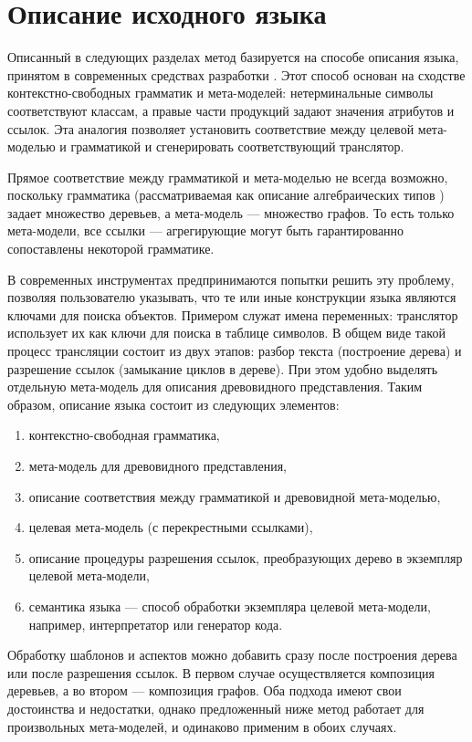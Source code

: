 \chapter{Описание исходного языка}

Описанный в следующих разделах метод базируется на способе описания языка, принятом в современных средствах разработки \cite{xText}. Этот способ основан на сходстве контекстно-свободных грамматик и мета-моделей: нетерминальные символы соответствуют классам, а правые части продукций задают значения атрибутов и ссылок. Эта аналогия позволяет установить соответствие между целевой мета-моделью и грамматикой и сгенерировать соответствующий транслятор.

Прямое соответствие между грамматикой и мета-моделью не всегда возможно, поскольку грамматика (рассматриваемая как описание алгебраических типов \cite{?}) задает множество деревьев, а мета-модель --- множество графов. То есть только мета-модели, все ссылки --- агрегирующие могут быть гарантированно сопоставлены некоторой грамматике.

В современных инструментах предпринимаются попытки решить эту проблему, позволяя пользователю указывать, что те или иные конструкции языка являются ключами для поиска объектов. Примером служат имена переменных: транслятор использует их как ключи для поиска в таблице символов. В общем виде такой процесс трансляции состоит из двух этапов: разбор текста (построение дерева) и разрешение ссылок (замыкание циклов в дереве).
При этом удобно выделять отдельную мета-модель для описания древовидного представления. Таким образом, описание языка состоит из следующих элементов:
\begin{enumerate}
\item контекстно-свободная грамматика,
\item мета-модель для древовидного представления,
\item описание соответствия между грамматикой и древовидной мета-моделью,
\item целевая мета-модель (с перекрестными ссылками),
\item описание процедуры разрешения ссылок, преобразующих дерево в экземпляр целевой мета-модели,
\item семантика языка --- способ обработки экземпляра целевой мета-модели, например, интерпретатор или генератор кода.
\end{enumerate}

Обработку шаблонов и аспектов можно добавить сразу после построения дерева или после разрешения ссылок. В первом случае осуществляется композиция деревьев, а во втором --- композиция графов. Оба подхода имеют свои достоинства и недостатки, однако предложенный ниже метод работает для произвольных мета-моделей, и одинаково применим в обоих случаях.



